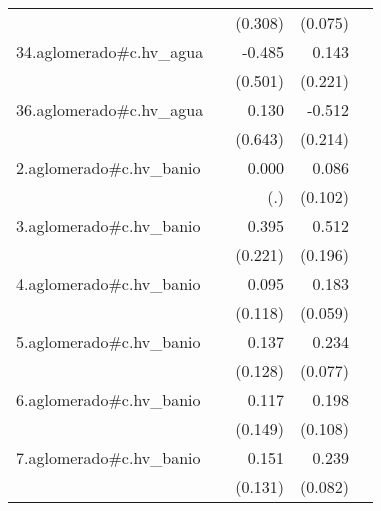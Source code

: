{\begin{longtable}{l*{4}{D{.}{.}{-1}}}
            &                     &     (0.308)         &     (0.075)         &                     \\
\addlinespace
34.aglomerado#c.hv\_agua&                     &      -0.485         &       0.143         &                     \\
            &                     &     (0.501)         &     (0.221)         &                     \\
\addlinespace
36.aglomerado#c.hv\_agua&                     &       0.130         &      -0.512\sym{*}  &                     \\
            &                     &     (0.643)         &     (0.214)         &                     \\
\addlinespace
2.aglomerado#c.hv\_banio&                     &       0.000         &       0.086         &                     \\
            &                     &         (.)         &     (0.102)         &                     \\
\addlinespace
3.aglomerado#c.hv\_banio&                     &       0.395         &       0.512\sym{**} &                     \\
            &                     &     (0.221)         &     (0.196)         &                     \\
\addlinespace
4.aglomerado#c.hv\_banio&                     &       0.095         &       0.183\sym{**} &                     \\
            &                     &     (0.118)         &     (0.059)         &                     \\
\addlinespace
5.aglomerado#c.hv\_banio&                     &       0.137         &       0.234\sym{**} &                     \\
            &                     &     (0.128)         &     (0.077)         &                     \\
\addlinespace
6.aglomerado#c.hv\_banio&                     &       0.117         &       0.198         &                     \\
            &                     &     (0.149)         &     (0.108)         &                     \\
\addlinespace
7.aglomerado#c.hv\_banio&                     &       0.151         &       0.239\sym{**} &                     \\
            &                     &     (0.131)         &     (0.082)         &                     \\

\end{longtable}}
